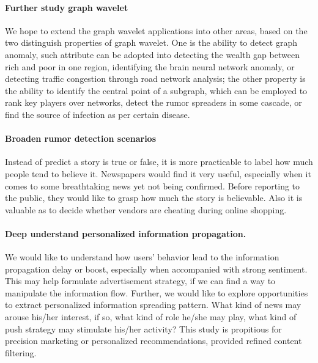 \paragraph{Further study graph wavelet}
We hope to extend the graph wavelet applications into other areas, based on the two distinguish properties of graph wavelet. One is the ability to detect graph anomaly, such attribute can be adopted into detecting the wealth gap between rich and poor in one region, identifying the brain neural network anomaly, or detecting traffic congestion through road network analysis; the other property is the ability to identify the central point of a subgraph, which can be employed to rank key players over networks, detect the rumor spreaders in some cascade, or find the source of infection as per certain disease.

\paragraph{Broaden rumor detection scenarios}
Instead of predict a story is true or false, it is more practicable to label how much people tend to believe it. Newspapers would find it very useful, especially when it comes to some breathtaking news yet not being confirmed. Before reporting to the public, they would like to grasp how much the story is believable. Also it is valuable as to decide whether vendors are cheating during online shopping.


\paragraph{Deep understand personalized information propagation.}
We would like to understand how users' behavior lead to the information propagation delay or boost, especially when accompanied with strong sentiment. This may help formulate advertisement strategy, if we can find a way to manipulate the information flow. Further, we would like to explore opportunities to extract personalized information spreading pattern. What kind of news may arouse his/her interest, if so, what kind of role he/she may play, what kind of push strategy may stimulate his/her activity? This study is propitious for precision marketing or personalized recommendations, provided refined content filtering.

